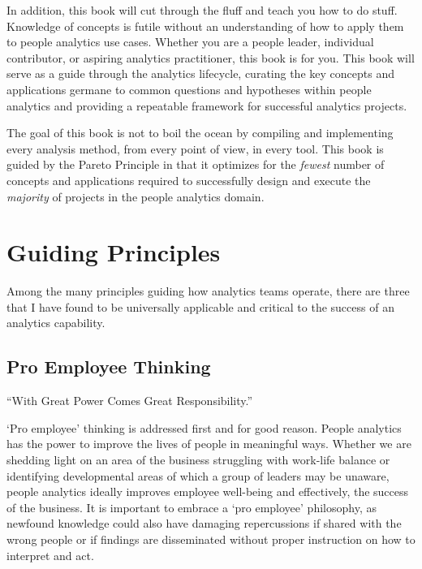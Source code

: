 \documentclass[
]{book}
\begin{document}
In addition, this book will cut through the fluff and teach you how to do stuff. Knowledge of concepts is futile without an understanding of how to apply them to people analytics use cases. Whether you are a people leader, individual contributor, or aspiring analytics practitioner, this book is for you. This book will serve as a guide through the analytics lifecycle, curating the key concepts and applications germane to common questions and hypotheses within people analytics and providing a repeatable framework for successful analytics projects.

The goal of this book is not to boil the ocean by compiling and implementing every analysis method, from every point of view, in every tool. This book is guided by the Pareto Principle in that it optimizes for the \emph{fewest} number of concepts and applications required to successfully design and execute the \emph{majority} of projects in the people analytics domain.

\hypertarget{guiding-principles}{%
\section{Guiding Principles}\label{guiding-principles}}

Among the many principles guiding how analytics teams operate, there are three that I have found to be universally applicable and critical to the success of an analytics capability.

\hypertarget{pro-employee-thinking}{%
\subsection{Pro Employee Thinking}\label{pro-employee-thinking}}

``With Great Power Comes Great Responsibility.''

`Pro employee' thinking is addressed first and for good reason. People analytics has the power to improve the lives of people in meaningful ways. Whether we are shedding light on an area of the business struggling with work-life balance or identifying developmental areas of which a group of leaders may be unaware, people analytics ideally improves employee well-being and effectively, the success of the business. It is important to embrace a `pro employee' philosophy, as newfound knowledge could also have damaging repercussions if shared with the wrong people or if findings are disseminated without proper instruction on how to interpret and act.
\end{document}

